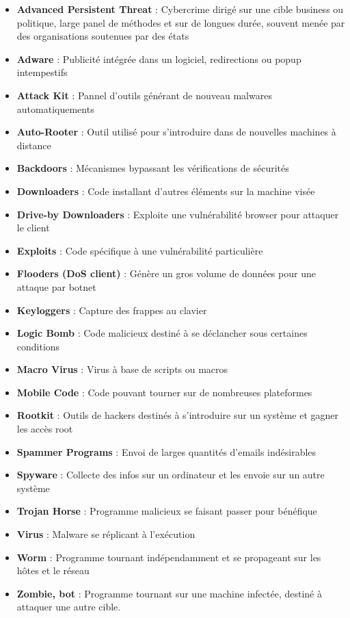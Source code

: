 \documentclass{report}
\begin{document}
		\begin{itemize}
			\item \textbf{Advanced Persistent Threat} : Cybercrime dirigé sur une cible business ou politique, large panel de méthodes et sur de longues durée, souvent menée par des organisations soutenues par des états
			\item \textbf{Adware} : Publicité intégrée dans un logiciel, redirections ou popup intempestifs
			\item \textbf{Attack Kit} : Pannel d'outils générant de nouveau malwares automatiquements 
			\item \textbf{Auto-Rooter} : Outil utilisé pour s'introduire dans de nouvelles machines à distance 
			\item \textbf{Backdoors} : Mécanismes bypassant les vérifications de sécurités

			\item \textbf{Downloaders} : Code installant d'autres éléments sur la machine visée
			\item \textbf{Drive-by Downloaders} : Exploite une vulnérabilité browser pour attaquer le client
			\item \textbf{Exploits} : Code spécifique à une vulnérabilité particulière
			\item \textbf{Flooders (DoS client)} : Génère un gros volume de données pour une attaque par botnet
			\item \textbf{Keyloggers} : Capture des frappes au clavier

			\item \textbf{Logic Bomb} : Code malicieux destiné à se déclancher sous certaines conditions
			\item \textbf{Macro Virus} : Virus à base de scripts ou macros
			\item \textbf{Mobile Code} : Code pouvant tourner sur de nombreuses plateformes
			\item \textbf{Rootkit} : Outils de hackers destinés à s'introduire sur un système et gagner les accès root
			\item \textbf{Spammer Programs} : Envoi de larges quantités d'emails indésirables

			\item \textbf{Spyware} : Collecte des infos sur un ordinateur et les envoie sur un autre système
			\item \textbf{Trojan Horse} : Programme malicieux se faisant passer pour bénéfique
			\item \textbf{Virus} : Malware se réplicant à l'exécution
			\item \textbf{Worm} : Programme tournant indépendamment et se propageant sur les hôtes et le réseau
			\item \textbf{Zombie, bot} : Programme tournant sur une machine infectée, destiné à attaquer une autre cible.\\
		\end{itemize}
\end{document}
